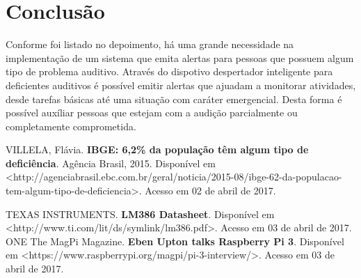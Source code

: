 \documentclass[conference]{IEEEtran}
\begin{document}
\section{Conclusão}

Conforme foi listado no depoimento, há uma grande necessidade na implementação de um sistema que emita alertas para pessoas que possuem algum tipo de problema auditivo. Através do dispotivo despertador inteligente para deficientes auditivos é possível emitir alertas que ajuadam a monitorar atividades, desde tarefas básicas até uma situação com caráter emergencial. Desta forma é possível auxíliar pessoas que estejam com a audição parcialmente ou completamente comprometida.

\begin{thebibliography}{1}

VILLELA, Flávia. \textbf{IBGE: 6,2\% da população têm algum tipo de deficiência}. Agência Brasil, 2015. Disponível em <http://agenciabrasil.ebc.com.br/geral/noticia/2015-08/ibge-62-da-populacao-tem-algum-tipo-de-deficiencia>. Acesso em 02 de abril de 2017.

TEXAS INSTRUMENTS. \textbf{LM386 Datasheet}. Disponível em <http://www.ti.com/lit/ds/symlink/lm386.pdf>. Acesso em 03 de abril de 2017.
ONE
 The MagPi Magazine. \textbf{Eben Upton talks Raspberry Pi 3}. Disponível em <https://www.raspberrypi.org/magpi/pi-3-interview/>. Acesso em 03 de abril de 2017.

\end{thebibliography}
\end{document}
